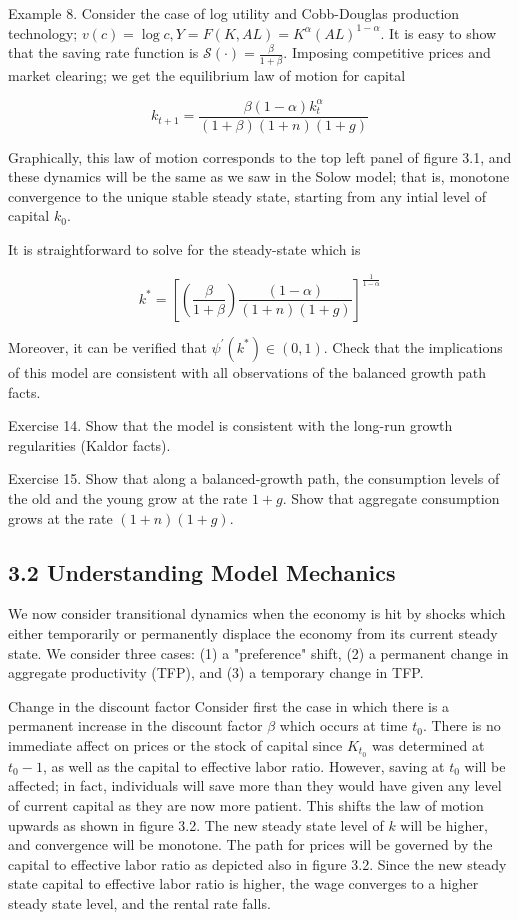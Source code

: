 \documentclass[10pt]{article}
\begin{document}
Example 8. Consider the case of log utility and Cobb-Douglas production technology; $v(c)=\log c, Y=F(K, A L)=K^{\alpha}(A L)^{1-\alpha}$. It is easy to show that the saving rate function is $\mathcal{S}(\cdot)=\frac{\beta}{1+\beta}$. Imposing competitive prices and market clearing; we get the equilibrium law of motion for capital

$$
k_{t+1}=\frac{\beta(1-\alpha) k_{t}^{\alpha}}{(1+\beta)(1+n)(1+g)}
$$

Graphically, this law of motion corresponds to the top left panel of figure 3.1, and these dynamics will be the same as we saw in the Solow model; that is, monotone convergence to the unique stable steady state, starting from any intial level of capital $k_{0}$.

It is straightforward to solve for the steady-state which is

$$
k^{*}=\left[\left(\frac{\beta}{1+\beta}\right) \frac{(1-\alpha)}{(1+n)(1+g)}\right]^{\frac{1}{1-\alpha}}
$$

Moreover, it can be verified that $\psi^{\prime}\left(k^{*}\right) \in(0,1)$. Check that the implications of this model are consistent with all observations of the balanced growth path facts.

Exercise 14. Show that the model is consistent with the long-run growth regularities (Kaldor facts).

Exercise 15. Show that along a balanced-growth path, the consumption levels of the old and the young grow at the rate $1+g$. Show that aggregate consumption grows at the rate $(1+n)(1+g)$.

\subsection*{3.2 Understanding Model Mechanics}
We now consider transitional dynamics when the economy is hit by shocks which either temporarily or permanently displace the economy from its current steady state. We consider three cases: (1) a "preference" shift, (2) a permanent change in aggregate productivity (TFP), and (3) a temporary change in TFP.

Change in the discount factor Consider first the case in which there is a permanent increase in the discount factor $\beta$ which occurs at time $t_{0}$. There is no immediate affect on prices or the stock of capital since $K_{t_{0}}$ was determined at $t_{0}-1$, as well as the capital to effective labor ratio. However, saving at $t_{0}$ will be affected; in fact, individuals will save more than they would have given any level of current capital as they are now more patient. This shifts the law of motion upwards as shown in figure 3.2. The new steady state level of $k$ will be higher, and convergence will be monotone. The path for prices will be governed by the capital to effective labor ratio as depicted also in figure 3.2. Since the new steady state capital to effective labor ratio is higher, the wage converges to a higher steady state level, and the rental rate falls.
\end{document}
